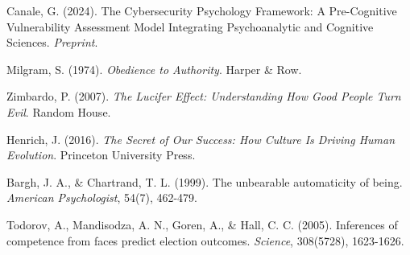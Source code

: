 \documentclass[11pt,a4paper]{article}
\begin{document}
\begin{thebibliography}{9}

Canale, G. (2024). The Cybersecurity Psychology Framework: A Pre-Cognitive Vulnerability Assessment Model Integrating Psychoanalytic and Cognitive Sciences. \textit{Preprint}.

Milgram, S. (1974). \textit{Obedience to Authority}. Harper \& Row.

Zimbardo, P. (2007). \textit{The Lucifer Effect: Understanding How Good People Turn Evil}. Random House.

Henrich, J. (2016). \textit{The Secret of Our Success: How Culture Is Driving Human Evolution}. Princeton University Press.

Bargh, J. A., \& Chartrand, T. L. (1999). The unbearable automaticity of being. \textit{American Psychologist}, 54(7), 462-479.

Todorov, A., Mandisodza, A. N., Goren, A., \& Hall, C. C. (2005). Inferences of competence from faces predict election outcomes. \textit{Science}, 308(5728), 1623-1626.

\end{thebibliography}
\end{document}
